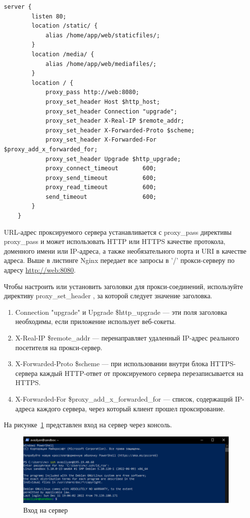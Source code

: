 \begin{lstlisting}[frame=single, label={rndhpcgui.2022.12.07.nginx.conf}, caption={nginx.conf}, language={nginx}] 
	server {
	    listen 80;
	    location /static/ {
	        alias /home/app/web/staticfiles/;
	    }
	    location /media/ {
	        alias /home/app/web/mediafiles/;
	    }
	    location / {
	        proxy_pass http://web:8080;
	        proxy_set_header Host $http_host;
	        proxy_set_header Connection "upgrade";
	        proxy_set_header X-Real-IP $remote_addr;
	        proxy_set_header X-Forwarded-Proto $scheme;
	        proxy_set_header X-Forwarded-For $proxy_add_x_forwarded_for;
	        proxy_set_header Upgrade $http_upgrade;
	        proxy_connect_timeout       600;
	        proxy_send_timeout          600;
	        proxy_read_timeout          600;
	        send_timeout                600;
	    }
	}
\end{lstlisting}

URL-адрес проксируемого сервера устанавливается с proxy_pass директивы proxy_pass и может использовать HTTP или HTTPS качестве протокола, доменного имени или IP-адреса, а также необязательного порта и URI в качестве адреса. Выше в листинге Nginx передает все запросы в '/' прокси-серверу по адресу \url{http://web:8080}.

Чтобы настроить или установить заголовки для прокси-соединений, используйте директиву proxy_set_header , за которой следует значение заголовка. 
\begin{enumerate}
	\item Connection "upgrade" и Upgrade \$http\_upgrade — эти поля заголовка необходимы, если приложение использует веб-сокеты.
	\item X-Real-IP \$remote_addr — перенаправляет удаленный IP-адрес реального посетителя на прокси-сервер.
	\item X-Forwarded-Proto \$scheme — при использовании внутри блока HTTPS-сервера каждый HTTP-ответ от проксируемого сервера перезаписывается на HTTPS.
	\item X-Forwarded-For \$proxy_add_x_forwarded_for — список, содержащий IP-адреса каждого сервера, через который клиент прошел проксирование.
\end{enumerate}

На рисунке~\ref{rndhpcgui.2022.12.07.picture1} представлен вход на сервер через консоль. 
\begin{figure}[!ht]
  \centering
  \includegraphics[scale=0.8]{ResearchNotes/rndhpc_dev_gui_2022_12_07/rndhpcgui.2022.12.07.picture1.png}
  \caption{Вход на сервер}\label{rndhpcgui.2022.12.07.picture1}
\end{figure}

